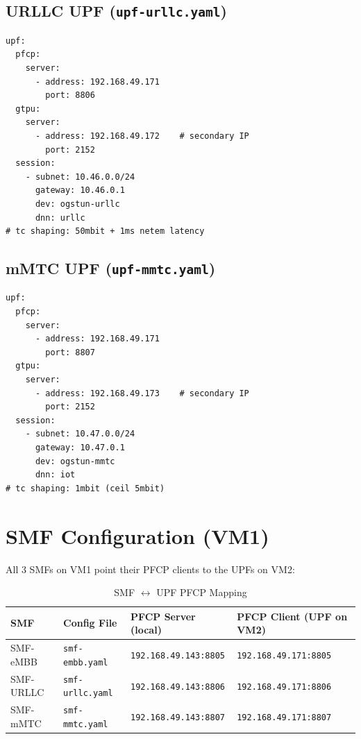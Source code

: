 \documentclass[12pt,a4paper]{article}
\begin{document}
\subsection{URLLC UPF (\texttt{upf-urllc.yaml})}

\begin{lstlisting}[style=yaml]
upf:
  pfcp:
    server:
      - address: 192.168.49.171
        port: 8806
  gtpu:
    server:
      - address: 192.168.49.172    # secondary IP
        port: 2152
  session:
    - subnet: 10.46.0.0/24
      gateway: 10.46.0.1
      dev: ogstun-urllc
      dnn: urllc
# tc shaping: 50mbit + 1ms netem latency
\end{lstlisting}

\subsection{mMTC UPF (\texttt{upf-mmtc.yaml})}

\begin{lstlisting}[style=yaml]
upf:
  pfcp:
    server:
      - address: 192.168.49.171
        port: 8807
  gtpu:
    server:
      - address: 192.168.49.173    # secondary IP
        port: 2152
  session:
    - subnet: 10.47.0.0/24
      gateway: 10.47.0.1
      dev: ogstun-mmtc
      dnn: iot
# tc shaping: 1mbit (ceil 5mbit)
\end{lstlisting}


\section{SMF Configuration (VM1)}

All 3 SMFs on VM1 point their PFCP clients to the UPFs on VM2:

\begin{table}[H]
\centering
\begin{tabular}{llll}
\toprule
\textbf{SMF} & \textbf{Config File} & \textbf{PFCP Server (local)} & \textbf{PFCP Client (UPF on VM2)} \\
\midrule
SMF-eMBB  & \texttt{smf-embb.yaml}  & \texttt{192.168.49.143:8805} & \texttt{192.168.49.171:8805} \\
SMF-URLLC & \texttt{smf-urllc.yaml} & \texttt{192.168.49.143:8806} & \texttt{192.168.49.171:8806} \\
SMF-mMTC  & \texttt{smf-mmtc.yaml}  & \texttt{192.168.49.143:8807} & \texttt{192.168.49.171:8807} \\
\bottomrule
\end{tabular}
\caption{SMF $\leftrightarrow$ UPF PFCP Mapping}
\end{table}
\end{document}
